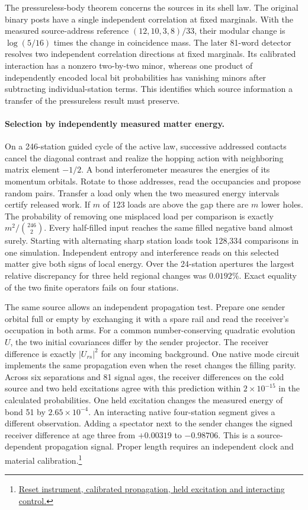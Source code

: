 \documentclass[11pt]{article}
\begin{document}
The pressureless-body theorem concerns the sources in its shell law.
The original binary posts have a single independent correlation at
fixed marginals. With the measured source-address reference
$(12,10,3,8)/33$, their modular change is $\log(5/16)$ times the change
in coincidence mass. The later 81-word detector resolves two
independent correlation directions at fixed marginals. Its calibrated
interaction has a nonzero two-by-two minor, whereas one product of
independently encoded local bit probabilities has vanishing minors
after subtracting individual-station terms. This identifies which
source information a transfer of the pressureless result must preserve.

\paragraph{Selection by independently measured matter energy.}
On a 246-station guided cycle of the active law, successive addressed
contacts cancel the diagonal contrast and realize the hopping action
with neighboring matrix element $-1/2$. A bond interferometer measures
the energies of its momentum orbitals. Rotate to those addresses, read
the occupancies and propose random pairs. Transfer a load only when
the two measured energy intervals certify released work. If $m$ of
123 loads are above the gap there are $m$ lower holes. The probability
of removing one misplaced load per comparison is exactly
$m^2/\binom{246}{2}$. Every half-filled input reaches the same filled
negative band almost surely. Starting with alternating sharp station
loads took 128,334 comparisons in one simulation. Independent entropy
and interference reads on this selected matter give both signs of local
energy. Over the 24-station apertures the largest relative discrepancy
for three held regional changes was $0.0192\%$. Exact equality of the
two finite operators fails on four stations.

The same source allows an independent propagation test. Prepare one
sender orbital full or empty by exchanging it with a spare rail and
read the receiver's occupation in both arms. For a common
number-conserving quadratic evolution $U$, the two initial covariances
differ by the sender projector. The receiver difference is exactly
$|U_{rs}|^2$ for any incoming background. One native mode circuit
implements the same propagation even when the reset changes the
filling parity. Across six separations and 81 signal ages, the
receiver differences on the cold source and two held excitations
agree with this prediction within $2\times10^{-15}$ in the
calculated probabilities. One held excitation changes the measured
energy of bond 51 by $2.65\times10^{-4}$. An interacting native
four-station segment gives a different observation. Adding a spectator
next to the sender changes the signed receiver difference at age
three from $+0.00319$ to $-0.98706$. This is a source-dependent
propagation signal. Proper length requires an independent clock and
material calibration.\footnote{\href{https://github.com/FloatingPragma/observer-patch-holography/tree/main/model/experiments/interval_echo_einstein_station/critical_exchange/signal_ruler}{Reset instrument, calibrated propagation, held excitation and interacting control.}}
\end{document}
